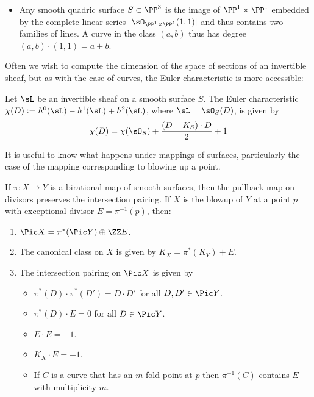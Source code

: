 \begin{example}[Quadrics in $\PP^3$]
\begin{itemize}
\item Any smooth quadric surface $S\subset \PP^3$ is the 
image of $\PP^1\times \PP^1$ embedded by the complete linear series
$|\sO_{\PP^1\times \PP^1}(1,1)|$ and thus contains two families of lines. 
A curve in the class $(a,b)$ thus has degree $(a,b)\cdot(1,1) = a+b$. 
\end{itemize}
\end{example}

Often we wish to compute the dimension of the space of sections of an invertible sheaf, but
as with the case of curves, the Euler characteristic is more accessible:

\begin{theorem} Let $\sL$ be an invertible sheaf on a smooth surface $S$.
The Euler characteristic $\chi(D) := h^0(\sL)-h^1(\sL)+h^2(\sL)$, where $\sL = \sO_S(D)$, is given by
$$
\chi(D) = \chi(\sO_S) + \frac{(D-K_S)\cdot D}{2}+1
$$
\end{theorem}


It is useful to know what happens under mappings of surfaces, particularly the case of the mapping
corresponding to blowing up a point.

\begin{theorem}
If $\pi: X \to Y$ is a birational map of smooth surfaces, then the pullback map on divisors
preserves the intersection pairing. If $X$ is the blowup of $Y$ at a point $p$ with exceptional
divisor $E = \pi^{-1}(p)$, then:

\begin{enumerate}
 \item $\Pic X =\pi^*(\Pic Y) \oplus \ZZ E$.
\item The canonical class on $X$ is given by $K_X = \pi^*(K_Y)+E$.
 \item The intersection pairing on $\Pic X$ is given by
 
\begin{itemize}
\item $\pi^*(D)\cdot\pi^*(D') = D\cdot D'$ for all $D,D'\in \Pic Y$.
\item $\pi^*(D)\cdot E = 0$ for all $D\in \Pic Y$.
 \item $E\cdot E = -1$.
 \item $K_X\cdot E = -1$.
 \item If $C$ is a curve that has an $m$-fold point at $p$ then $\pi^{-1}(C)$ contains $E$ with multiplicity $m$.
 \end{itemize}
\end{enumerate}
\end{theorem}


